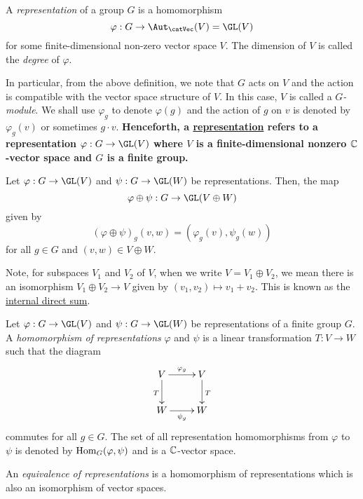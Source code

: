 \begin{definition}[Representation]
    A \textit{representation} of a group $G$ is a homomorphism $$\varphi: G\to\Aut_{\catVec}(V) = \GL(V)$$ for some finite-dimensional non-zero vector space $V$. The dimension of $V$ is called the \textit{degree} of $\varphi$.
\end{definition}

In particular, from the above definition, we note that $G$ acts on $V$ and the action is compatible with the vector space structure of $V$. In this case, $V$ is called a \textit{$G$-module}. We shall use $\varphi_g$ to denote $\varphi(g)$ and the action of $g$ on $v$ is denoted by $\varphi_g(v)$ or sometimes $g\cdot v$. \textbf{Henceforth, a \underline{representation} refers to a representation $\varphi:G\to\GL(V)$ where $V$ is a finite-dimensional nonzero $\mathbb{C}$-vector space and $G$ is a finite group.}

\begin{definition}
    Let $\varphi: G\to\GL(V)$ and $\psi: G\to\GL(W)$ be representations. Then, the map 
    \begin{equation*}
        \varphi\oplus\psi: G\to\GL(V\oplus W)
    \end{equation*}
    given by 
    \begin{equation*}
        \left(\varphi\oplus\psi\right)_g(v,w) = \left(\varphi_g(v),\psi_g(w)\right)
    \end{equation*}
    for all $g\in G$ and $(v,w)\in V\oplus W$.
\end{definition}

Note, for subspaces $V_1$ and $V_2$ of $V$, when we write $V = V_1\oplus V_2$, we mean there is an isomorphism $V_1\oplus V_2\to V$ given by $(v_1,v_2)\mapsto v_1 + v_2$. This is known as the \underline{internal direct sum}.

\begin{definition}
    Let $\varphi: G\to\GL(V)$ and $\psi: G\to\GL(W)$ be representations of a finite group $G$. A \textit{homomorphism of representations} $\varphi$ and $\psi$ is a linear transformation $T: V\to W$ such that the diagram 
    \begin{equation*}
        \xymatrix{
            V\ar[r]^{\varphi_g}\ar[d]_T & V\ar[d]^T\\
            W\ar[r]_{\psi_g} & W
        }
    \end{equation*}
    commutes for all $g\in G$. The set of all representation homomorphisms from $\varphi$ to $\psi$ is denoted by $\operatorname{Hom}_G(\varphi,\psi)$ and is a $\mathbb{C}$-vector space.
    
    An \textit{equivalence of representations} is a homomorphism of representations which is also an isomorphism of vector spaces.
\end{definition}

